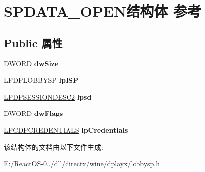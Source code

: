 \hypertarget{struct_s_p_d_a_t_a___o_p_e_n}{}\section{S\+P\+D\+A\+T\+A\+\_\+\+O\+P\+E\+N结构体 参考}
\label{struct_s_p_d_a_t_a___o_p_e_n}
\subsection*{Public 属性}
\begin{DoxyCompactItemize}
\item 
\mbox{\label{struct_s_p_d_a_t_a___o_p_e_n_adc6168e779820560195749ce9a0b645e}} 
D\+W\+O\+RD {\bfseries dw\+Size}
\item 
\mbox{\label{struct_s_p_d_a_t_a___o_p_e_n_a35e4d04fcb52f743ebfb62bcf354388f}} 
L\+P\+D\+P\+L\+O\+B\+B\+Y\+SP {\bfseries lp\+I\+SP}
\item 
\mbox{\label{struct_s_p_d_a_t_a___o_p_e_n_aa32d2ef44e83fcca31d0f2ad212a6c34}} 
\hyperlink{structtag_d_p_s_e_s_s_i_o_n_d_e_s_c2}{L\+P\+D\+P\+S\+E\+S\+S\+I\+O\+N\+D\+E\+S\+C2} {\bfseries lpsd}
\item 
\mbox{\label{struct_s_p_d_a_t_a___o_p_e_n_ae1a8e87932a5701c50c46a99833746bf}} 
D\+W\+O\+RD {\bfseries dw\+Flags}
\item 
\mbox{\label{struct_s_p_d_a_t_a___o_p_e_n_a30ba6386696f11f73d45446a72376189}} 
\hyperlink{structtag_d_p_c_r_e_d_e_n_t_i_a_l_s}{L\+P\+C\+D\+P\+C\+R\+E\+D\+E\+N\+T\+I\+A\+LS} {\bfseries lp\+Credentials}
\end{DoxyCompactItemize}


该结构体的文档由以下文件生成\+:\begin{DoxyCompactItemize}
\item 
E\+:/\+React\+O\+S-\/0../dll/directx/wine/dplayx/lobbysp.\+h\end{DoxyCompactItemize}
